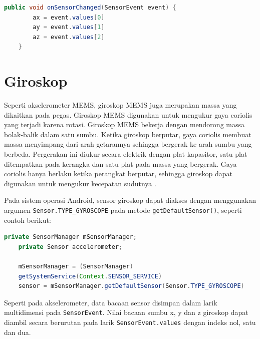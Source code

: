 \begin{lstlisting}[language=Java]
    public void onSensorChanged(SensorEvent event) {
        ax = event.values[0]
        ay = event.values[1]
        az = event.values[2]
    }
\end{lstlisting}


\section{Giroskop}
Seperti akselerometer MEMS, giroskop MEMS juga merupakan massa yang dikaitkan pada pegas. Giroskop MEMS digunakan untuk mengukur gaya coriolis yang terjadi karena rotasi. Giroskop MEMS bekerja dengan mendorong massa bolak-balik dalam satu sumbu. Ketika giroskop berputar, gaya coriolis membuat massa menyimpang dari arah getarannya sehingga bergerak ke arah sumbu yang berbeda. Pergerakan ini diukur secara elektrik dengan plat kapasitor, satu plat ditempatkan pada kerangka dan satu plat pada massa yang bergerak. Gaya coriolis hanya berlaku ketika perangkat berputar, sehingga giroskop dapat digunakan untuk mengukur kecepatan sudutnya \citep{milette-2012}.

Pada sistem operasi Android, sensor giroskop dapat diakses dengan menggunakan argumen \lstinline{Sensor.TYPE_GYROSCOPE} pada metode \lstinline{getDefaultSensor()}, seperti contoh berikut:

\begin{lstlisting}[language=Java]
    private SensorManager mSensorManager;
    private Sensor accelerometer;

    mSensorManager = (SensorManager)
    getSystemService(Context.SENSOR_SERVICE)
    sensor = mSensorManager.getDefaultSensor(Sensor.TYPE_GYROSCOPE)
\end{lstlisting}

Seperti pada akselerometer, data bacaan sensor disimpan dalam larik multidimensi pada \lstinline{SensorEvent}. Nilai bacaan sumbu x, y dan z giroskop dapat diambil secara berurutan pada larik \lstinline{SensorEvent.values} dengan indeks nol, satu dan dua.


